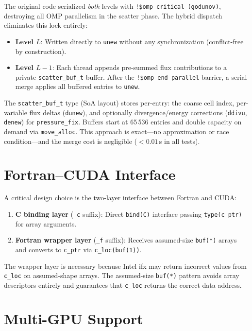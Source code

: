 \documentclass[11pt,fleqn]{book}
\begin{document}
The original code serialized \emph{both} levels with \texttt{!\$omp critical (godunov)}, destroying all OMP parallelism in the scatter phase.  The hybrid dispatch eliminates this lock entirely:

\begin{itemize}[nosep]
\item \textbf{Level $L$}: Written directly to \texttt{unew} without any synchronization (conflict-free by construction).
\item \textbf{Level $L{-}1$}: Each thread appends pre-summed flux contributions to a private \texttt{scatter\_buf\_t} buffer.  After the \texttt{!\$omp end parallel} barrier, a serial merge applies all buffered entries to \texttt{unew}.
\end{itemize}

The \texttt{scatter\_buf\_t} type (SoA layout) stores per-entry: the coarse cell index, per-variable flux deltas (\texttt{dunew}), and optionally divergence/energy corrections (\texttt{ddivu}, \texttt{denew}) for \texttt{pressure\_fix}.  Buffers start at 65\,536 entries and double capacity on demand via \texttt{move\_alloc}.  This approach is exact---no approximation or race condition---and the merge cost is negligible ($< 0.01$\,s in all tests).

\section{Fortran--CUDA Interface}

A critical design choice is the two-layer interface between Fortran and CUDA:

\begin{enumerate}[nosep]
\item \textbf{C binding layer} (\texttt{\_c} suffix): Direct \texttt{bind(C)} interface passing \texttt{type(c\_ptr)} for array arguments.
\item \textbf{Fortran wrapper layer} (\texttt{\_f} suffix): Receives assumed-size \texttt{buf(*)} arrays and converts to \texttt{c\_ptr} via \texttt{c\_loc(buf(1))}.
\end{enumerate}

The wrapper layer is necessary because Intel ifx may return incorrect values from \texttt{c\_loc} on assumed-shape arrays.  The assumed-size \texttt{buf(*)} pattern avoids array descriptors entirely and guarantees that \texttt{c\_loc} returns the correct data address.

\section{Multi-GPU Support}
\end{document}
